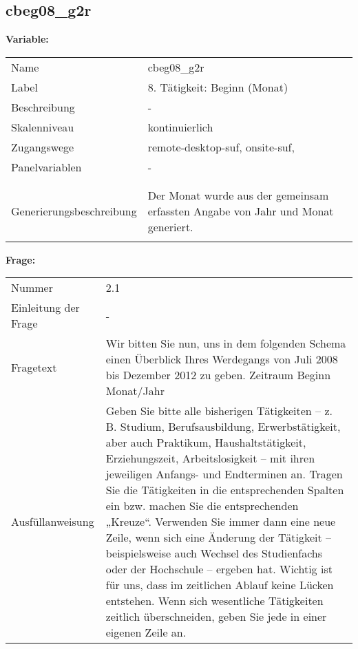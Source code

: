 	
	
	\subsection{cbeg08\_g2r}
	\label{subSection:cbeg08_g2r}

	\noindent\textbf{Variable:}\\
		\begin{tabular}{lL{11.3cm}}
			\label{tableVariable:cbeg08_g2r}
			Name & cbeg08\_g2r \\
			Label & 8. Tätigkeit: Beginn (Monat)  \\
			Beschreibung & - \\
			Skalenniveau & kontinuierlich \\
			Zugangswege &
				remote-desktop-suf,
				onsite-suf,
 \\
			Panelvariablen & -
			 \\
			 \\
 \\
					Generierungsbeschreibung & Der Monat wurde aus der gemeinsam erfassten Angabe von Jahr und Monat generiert. 
				 \\	
			 \\
		\end{tabular}

		\vspace*{1 cm}
		\noindent\textbf{Frage:}\\
		\begin{tabular}{lL{11.3cm}}
			\label{tableQuestion:cbeg08_g2r}
			Nummer & 2.1 \\
			Einleitung der Frage & - \\
			Fragetext & Wir bitten Sie nun, uns in dem folgenden Schema einen Überblick Ihres Werdegangs von Juli 2008 bis Dezember 2012 zu geben.
Zeitraum
Beginn
Monat/Jahr \\
			Ausfüllanweisung & Geben Sie bitte alle bisherigen Tätigkeiten – z. B. Studium, Berufsausbildung, Erwerbstätigkeit, aber auch Praktikum, Haushaltstätigkeit,
Erziehungszeit, Arbeitslosigkeit – mit ihren jeweiligen Anfangs- und Endterminen an. Tragen Sie die Tätigkeiten in die entsprechenden Spalten ein bzw. machen Sie die entsprechenden „Kreuze“. Verwenden Sie immer dann eine neue Zeile, wenn sich eine Änderung der Tätigkeit – beispielsweise auch Wechsel des Studienfachs oder der Hochschule – ergeben hat. Wichtig ist für uns, dass im zeitlichen Ablauf keine Lücken entstehen. Wenn sich wesentliche Tätigkeiten zeitlich überschneiden, geben Sie jede in einer eigenen Zeile an. \\
		\end{tabular}




